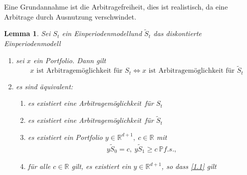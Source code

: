 \documentclass[]{scrartcl}
\numberwithin{equation}{section}
\theoremstyle{plain}
\newtheorem{lem}[satz]{Lemma}
\theoremstyle{definition}
\theoremstyle{remark}
\theoremstyle{proof}
\renewcommand{\P}{\mathbb{P}}
\newcommand{\R}{\mathbb{R}}
\newcommand{\epm}{Einperiodenmodell}
\newcommand{\am}{Arbitragemöglichkeit}
\begin{document}
	Eine Grundannahme ist die Arbitragefreiheit, dies ist realistisch, da eine Arbitrage durch Ausnutzung verschwindet.
	\begin{lem}
		Sei $S_t$ ein \epm und $\tilde{S}_t$ das diskontierte \epm
		\begin{enumerate}
			\item sei $x$ ein Portfolio. Dann gilt \[x\text{ ist \am\ für }S_t\Longleftrightarrow x\text{ ist \am\ für }\tilde{S}_t\]
			\item es sind äquivalent:
			\begin{enumerate}
				\item es existiert eine \am\ für $S_t$
				\item es existiert eine \am\ für $\tilde{S}_t$
				\item es existiert ein Portfolio $y\in\R^{d+1},\ c\in \R$ mit 
				\begin{align}\label{1.1}
					y\tilde{S}_0=c,\ y\tilde{S}_1\ge c\ \P f.s.,\ 
				\end{align}
				\item für alle $c\in\R$ gilt, es existiert ein $y\in\R^{d+1}$, so dass \ref{1.1} gilt
			\end{enumerate}
		\end{enumerate}
	\end{lem}
\end{document}
